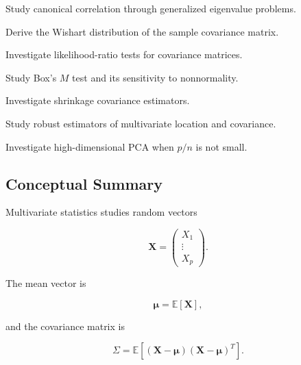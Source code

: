 \begin{exercise}[4]
Study canonical correlation through generalized eigenvalue problems.
\end{exercise}

\begin{exercise}[4]
Derive the Wishart distribution of the sample covariance matrix.
\end{exercise}

\begin{exercise}[4]
Investigate likelihood-ratio tests for covariance matrices.
\end{exercise}

\begin{exercise}[4]
Study Box's \(M\) test and its sensitivity to nonnormality.
\end{exercise}

\begin{exercise}[4]
Investigate shrinkage covariance estimators.
\end{exercise}

\begin{exercise}[4]
Study robust estimators of multivariate location and covariance.
\end{exercise}

\begin{exercise}[4]
Investigate high-dimensional PCA when \(p/n\) is not small.
\end{exercise}

\subsection{Conceptual Summary}
\label{subsec:multivariate-summary}

Multivariate statistics studies random vectors

\[
\boxed{
\mathbf{X}
=
\begin{pmatrix}
X_1\\
\vdots\\
X_p
\end{pmatrix}.
}
\]

The mean vector is

\[
\boxed{
\boldsymbol{\mu}
=
\mathbb{E}[\mathbf{X}],
}
\]

and the covariance matrix is

\[
\boxed{
\Sigma
=
\mathbb{E}
\left[
(
\mathbf{X}-\boldsymbol{\mu}
)
(
\mathbf{X}-\boldsymbol{\mu}
)^T
\right].
}
\]

